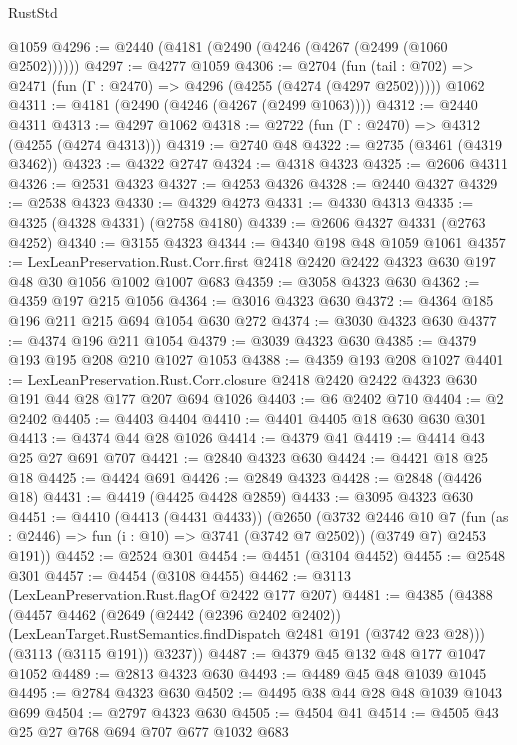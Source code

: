 \begin{lexlean}{RustStd}
\begin{coremodule}
{\begin{coremodule}
{{{{{{{{{{{{    @1059
@4296 := @2440 (@4181 (@2490 (@4246 (@4267 (@2499 (@1060 @2502))))))
@4297 := @4277 @1059
@4306 := @2704
    (fun (tail : @702) => @2471 (fun (Γ : @2470) => @4296 (@4255 (@4274 (@4297 @2502)))))
    @1062
@4311 := @4181 (@2490 (@4246 (@4267 (@2499 @1063))))
@4312 := @2440 @4311
@4313 := @4297 @1062
@4318 := @2722 (fun (Γ : @2470) => @4312 (@4255 (@4274 @4313)))
@4319 := @2740 @48
@4322 := @2735 (@3461 (@4319 @3462))
@4323 := @4322 @2747
@4324 := @4318 @4323
@4325 := @2606 @4311
@4326 := @2531 @4323
@4327 := @4253 @4326
@4328 := @2440 @4327
@4329 := @2538 @4323
@4330 := @4329 @4273
@4331 := @4330 @4313
@4335 := @4325 (@4328 @4331) (@2758 @4180)
@4339 := @2606 @4327 @4331 (@2763 @4252)
@4340 := @3155 @4323
@4344 := @4340 @198 @48 @1059 @1061
@4357 := LexLeanPreservation.Rust.Corr.first
    @2418
    @2420
    @2422
    @4323
    @630
    @197
    @48
    @30
    @1056
    @1002
    @1007
    @683
@4359 := @3058 @4323 @630
@4362 := @4359 @197 @215 @1056
@4364 := @3016 @4323 @630
@4372 := @4364 @185 @196 @211 @215 @694 @1054 @630 @272
@4374 := @3030 @4323 @630
@4377 := @4374 @196 @211 @1054
@4379 := @3039 @4323 @630
@4385 := @4379 @193 @195 @208 @210 @1027 @1053
@4388 := @4359 @193 @208 @1027
@4401 := LexLeanPreservation.Rust.Corr.closure
    @2418
    @2420
    @2422
    @4323
    @630
    @191
    @44
    @28
    @177
    @207
    @694
    @1026
@4403 := @6 @2402 @710
@4404 := @2 @2402
@4405 := @4403 @4404
@4410 := @4401 @4405 @18 @630 @630 @301
@4413 := @4374 @44 @28 @1026
@4414 := @4379 @41
@4419 := @4414 @43 @25 @27 @691 @707
@4421 := @2840 @4323 @630
@4424 := @4421 @18 @25 @18
@4425 := @4424 @691
@4426 := @2849 @4323
@4428 := @2848 (@4426 @18)
@4431 := @4419 (@4425 @4428 @2859)
@4433 := @3095 @4323 @630
@4451 := @4410
    (@4413 (@4431 @4433))
    (@2650
      (@3732
        @2446
        @10
        @7
        (fun (as : @2446) => fun (i : @10) => @3741 (@3742 @7 @2502))
        (@3749 @7)
        @2453
        @191))
@4452 := @2524 @301
@4454 := @4451 (@3104 @4452)
@4455 := @2548 @301
@4457 := @4454 (@3108 @4455)
@4462 := @3113 (LexLeanPreservation.Rust.flagOf @2422 @177 @207)
@4481 := @4385
    (@4388
      (@4457
        @4462
        (@2649
          (@2442 (@2396 @2402 @2402))
          (LexLeanTarget.RustSemantics.findDispatch @2481 @191 (@3742 @23 @28)))
        (@3113 (@3115 @191))
        @3237))
@4487 := @4379 @45 @132 @48 @177 @1047 @1052
@4489 := @2813 @4323 @630
@4493 := @4489 @45 @48 @1039 @1045
@4495 := @2784 @4323 @630
@4502 := @4495 @38 @44 @28 @48 @1039 @1043 @699
@4504 := @2797 @4323 @630
@4505 := @4504 @41
@4514 := @4505 @43 @25 @27 @768 @694 @707 @677 @1032 @683
}}}}}}}}}}}}
\end{coremodule}}
\end{coremodule}
\end{lexlean}
